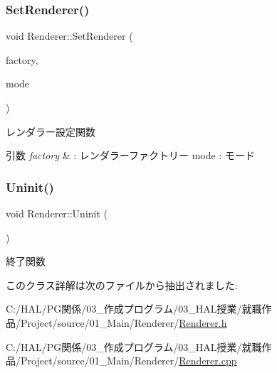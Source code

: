 \mbox{\label{class_renderer_a249147991a8187a3d373fd6bd43e8c54}} 
\subsubsection{\texorpdfstring{Set\+Renderer()}{SetRenderer()}}
{\footnotesize\ttfamily void Renderer\+::\+Set\+Renderer (\begin{DoxyParamCaption}\item[{\mbox{\hyperlink{class_renderer_factory}{Renderer\+Factory}} $\ast$}]{factory,  }\item[{\mbox{\hyperlink{class_renderer_ab5a9379ccadcf2b3394c61cf8c835fec}{M\+O\+DE}}}]{mode }\end{DoxyParamCaption})}



レンダラー設定関数 


\begin{DoxyParams}{引数}
{\em factory} & \+: レンダラーファクトリー mode \+: モード \\
\hline
\end{DoxyParams}
\mbox{\label{class_renderer_ae865246d6a04d467ac22458f6f5f69d4}} 
\subsubsection{\texorpdfstring{Uninit()}{Uninit()}}
{\footnotesize\ttfamily void Renderer\+::\+Uninit (\begin{DoxyParamCaption}{ }\end{DoxyParamCaption})}



終了関数 



このクラス詳解は次のファイルから抽出されました\+:\begin{DoxyCompactItemize}
\item 
C\+:/\+H\+A\+L/\+P\+G関係/03\+\_\+作成プログラム/03\+\_\+\+H\+A\+L授業/就職作品/\+Project/source/01\+\_\+\+Main/\+Renderer/\mbox{\hyperlink{_renderer_8h}{Renderer.\+h}}\item 
C\+:/\+H\+A\+L/\+P\+G関係/03\+\_\+作成プログラム/03\+\_\+\+H\+A\+L授業/就職作品/\+Project/source/01\+\_\+\+Main/\+Renderer/\mbox{\hyperlink{_renderer_8cpp}{Renderer.\+cpp}}\end{DoxyCompactItemize}
